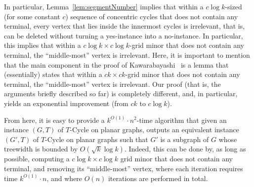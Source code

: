 \documentclass{article}
\numberwithin{claimcounter}{lemma}
\begin{document}
 In particular, Lemma~\ref{lem:segmentNumber} implies that within a $c\log k$-sized (for some constant $c$) sequence of concentric cycles that does not contain any terminal, every vertex that lies inside the innermost cycles is irrelevant, that is, can be deleted without turning a yes-instance into a no-instance. In particular, this implies that within a $c\log k\times c\log k$-grid minor that does not contain any terminal, the ``middle-most'' vertex is irrelevant. Here, it is important to mention that the main component in the proof of Kawarabayashi~\cite{kawarabayashi2008improved} is a lemma that (essentially) states that within a $ck\times ck$-grid minor  that does not contain any terminal, the ``middle-most'' vertex is irrelevant. Our proof (that is, the arguments briefly described so far) is completely different, and, in particular, yields an exponential improvement (from $ck$ to $c\log k$).
 
 From here, it is easy to provide a $k^{O(1)}\cdot n^2$-time algorithm that given an instance $(G,T)$ of {\sc $T$-Cycle} on planar graphs, outputs an equivalent instance $(G',T)$ of {\sc $T$-Cycle} on planar graphs such that $G'$ is a subgraph of $G$ whose treewidth is bounded by $O(\sqrt{k}\log k)$. Indeed, this can be done by, as long as possible, computing a $c\log k\times c\log k$ grid minor that does not contain any terminal, and removing its ``middle-most'' vertex, where each iteration requires time $k^{O(1)}\cdot n$, and where $O(n)$ iterations are performed in total.
 
\end{document}
